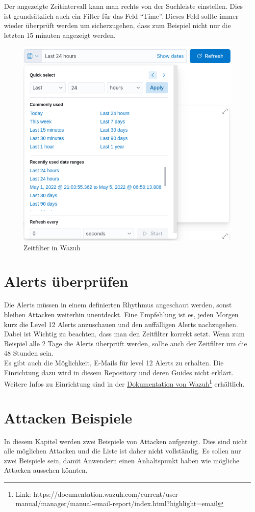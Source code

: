 Der angezeigte Zeitintervall kann man rechts von der Suchleiste einstellen.
Dies ist grundsätzlich auch ein Filter für das Feld ``Time''.
Dieses Feld sollte immer wieder überprüft werden um sicherzugehen, dass zum Beispiel nicht nur die letzten 15 minuten angezeigt werden.
\begin{figure}[H]
    \centering
    \includegraphics[width=0.7\linewidth]{../img/zeitfilter.png}
    \caption{Zeitfilter in Wazuh}
\end{figure}

\section{Alerts überprüfen}
Die Alerts müssen in einem definierten Rhythmus angeschaut werden, sonst bleiben Attacken weiterhin unentdeckt.
Eine Empfehlung ist es, jeden Morgen kurz die Level 12 Alerts anzuschauen und den auffälligen Alerts nachzugehen.
Dabei ist Wichtig zu beachten, dass man den Zeitfilter korrekt setzt. 
Wenn zum Beispiel alle 2 Tage die Alerts überprüft werden, sollte auch der Zeitfilter um die 48 Stunden sein.\\

Es gibt auch die Möglichkeit, E-Mails für level 12 Alerts zu erhalten.
Die Einrichtung dazu wird in diesem Repository und deren Guides nicht erklärt.
Weitere Infos zu Einrichtung sind in der \href{https://documentation.wazuh.com/current/user-manual/manager/manual-email-report/index.html?highlight=email}{Dokumentation von Wazuh}\footnote{Link: https://documentation.wazuh.com/current/user-manual/manager/manual-email-report/index.html?highlight=email} erhältlich.


\section{Attacken Beispiele}
In diesem Kapitel werden zwei Beispiele von Attacken aufgezeigt.
Dies sind nicht alle möglichen Attacken und die Liste ist daher nicht vollständig.
Es sollen nur zwei Beispiele sein, damit Anwendern einen Anhaltspunkt haben wie mögliche Attacken aussehen könnten.\\

